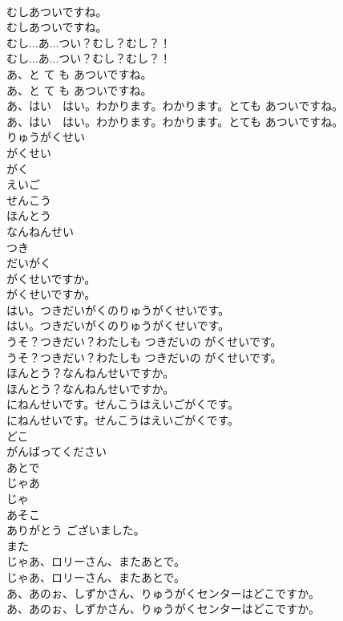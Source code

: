 \documentclass[8pt]{extreport}
\begin{document}
\begin{CJK}{UTF8}{min}
\\	むしあついですね。	
\\	むしあついですね。 
\\	むし...あ...つい？むし？むし？！	
\\	むし...あ...つい？むし？むし？！ 
\\	あ、と て も あついですね。	
\\	あ、と て も あついですね。 
\\	あ、はい　はい。わかります。わかります。とても あついですね。	
\\	あ、はい　はい。わかります。わかります。とても あついですね。 
\\	りゅうがくせい
\\	がくせい
\\	がく
\\	えいご
\\	せんこう
\\	ほんとう
\\	なんねんせい
\\	つき
\\	だいがく
\\	がくせいですか。	
\\	がくせいですか。 
\\	はい。つきだいがくのりゅうがくせいです。	
\\	はい。つきだいがくのりゅうがくせいです。 
\\	うそ？つきだい？わたしも つきだいの がくせいです。	
\\	うそ？つきだい？わたしも つきだいの がくせいです。 
\\	ほんとう？なんねんせいですか。	
\\	ほんとう？なんねんせいですか。 
\\	にねんせいです。せんこうはえいごがくです。	
\\	にねんせいです。せんこうはえいごがくです。 
\\	どこ
\\	がんばってください
\\	あとで
\\	じゃあ 
\\	じゃ
\\	あそこ
\\	ありがとう ございました。
\\	また
\\	じゃあ、ロリーさん、またあとで。	
\\	じゃあ、ロリーさん、またあとで。 
\\	あ、あのぉ、しずかさん、りゅうがくセンターはどこですか。	
\\	あ、あのぉ、しずかさん、りゅうがくセンターはどこですか。 

\end{CJK}
\end{document}
